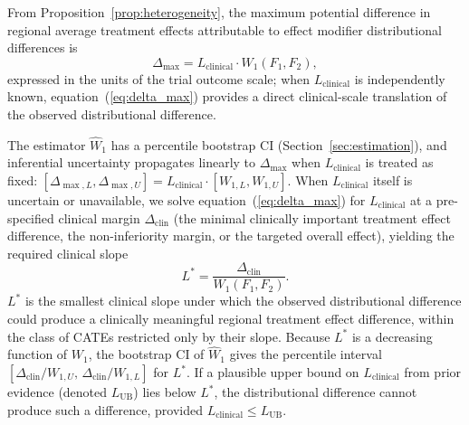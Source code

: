 \documentclass[AMA,Times1COL]{WileyNJDv5}
\begin{document}
From Proposition~\ref{prop:heterogeneity}, the maximum potential difference in regional average treatment effects attributable to effect modifier distributional differences is
\begin{equation}
\Delta_{\max} = L_{\text{clinical}} \cdot W_1(F_1, F_2),
\label{eq:delta_max}
\end{equation}
expressed in the units of the trial outcome scale; when $L_{\text{clinical}}$ is independently known, equation~(\ref{eq:delta_max}) provides a direct clinical-scale translation of the observed distributional difference.

The estimator $\widehat{W}_1$ has a percentile bootstrap CI (Section~\ref{sec:estimation}), and inferential uncertainty propagates linearly to $\Delta_{\max}$ when $L_{\text{clinical}}$ is treated as fixed: $[\Delta_{\max,L}, \Delta_{\max,U}] = L_{\text{clinical}} \cdot [W_{1,L}, W_{1,U}]$. When $L_{\text{clinical}}$ itself is uncertain or unavailable, we solve equation~(\ref{eq:delta_max}) for $L_{\text{clinical}}$ at a pre-specified clinical margin $\Delta_{\text{clin}}$ (the minimal clinically important treatment effect difference, the non-inferiority margin, or the targeted overall effect), yielding the required clinical slope
\begin{equation}
L^* = \frac{\Delta_{\text{clin}}}{W_1(F_1, F_2)}.
\label{eq:lstar}
\end{equation}
$L^*$ is the smallest clinical slope under which the observed distributional difference could produce a clinically meaningful regional treatment effect difference, within the class of CATEs restricted only by their slope. Because $L^*$ is a decreasing function of $W_1$, the bootstrap CI of $\widehat{W}_1$ gives the percentile interval $[\Delta_{\text{clin}}/W_{1,U},\, \Delta_{\text{clin}}/W_{1,L}]$ for $L^*$. If a plausible upper bound on $L_{\text{clinical}}$ from prior evidence (denoted $L_{\text{UB}}$) lies below $L^*$, the distributional difference cannot produce such a difference, provided $L_{\text{clinical}} \leq L_{\text{UB}}$.
\end{document}
